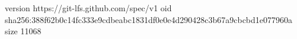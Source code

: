 version https://git-lfs.github.com/spec/v1
oid sha256:388f62b0c14fc333e9cdbeabc1831df0e0e4d290428c3b67a9cbcbd1e077960a
size 11068
